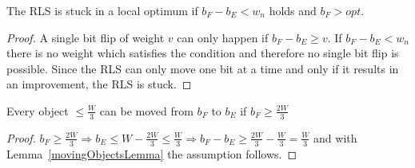 \begin{corollary}\label{cor:RLSStuck}
    The RLS is stuck in a local optimum if \(b_F-b_E < w_n\) holds and \(b_F > opt\).
\end{corollary}
\begin{proof}
    A single bit flip of weight $v$ can only happen if \(b_F - b_E \ge v\). If \(b_F-b_E < w_n\) there is no weight which satisfies the condition and therefore no single bit flip is possible.
    Since the RLS can only move one bit at a time and only if it results in an improvement, the RLS is stuck.
\end{proof}

\begin{corollary}\label{movingObjectsCorollary}
    Every object \(\le \frac{W}{3}\) can be moved from $b_F$ to $b_E$ if \(b_F \ge \frac{2W}{3}\)
\end{corollary}
\begin{proof}
    \(b_F \ge \frac{2W}{3} \Rightarrow b_E \le W - \frac{2W}{3} \le \frac{W}{3} \Rightarrow b_F - b_E \ge \frac{2W}{3} - \frac{W}{3} = \frac{W}{3}\) and with Lemma~\ref{movingObjectsLemma} the assumption follows.
\end{proof}

